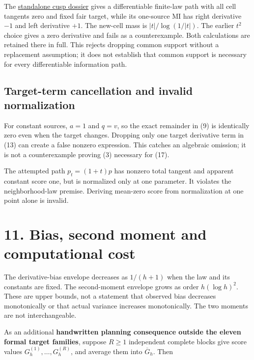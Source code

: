 \documentclass[11pt,a4paper]{article}
\begin{document}
The \href{https://github.com/sepahead/pid-rs/blob/main/audit/research/support-change-mi-cusp/EXPOSITION.md}{standalone cusp dossier} gives a differentiable finite-law path with all cell tangents zero and fixed fair target, while its one-source MI has right derivative \(-1\) and left derivative \(+1\). The new-cell mass is \(|t|/\log(1/|t|)\). The earlier \(t^2\) choice gives a zero derivative and fails as a counterexample. Both calculations are retained there in full. This rejects dropping common support without a replacement assumption; it does not establish that common support is necessary for every differentiable information path.

\subsection{Target-term cancellation and invalid normalization}\label{target-term-cancellation-and-invalid-normalization}

For constant sources, \(a=1\) and \(q=v\), so the exact remainder in (9) is identically zero even when the target changes. Dropping only one target derivative term in (13) can create a false nonzero expression. This catches an algebraic omission; it is not a counterexample proving (3) necessary for (17).

The attempted path \(p_t=(1+t)p\) has nonzero total tangent and apparent constant score one, but is normalized only at one parameter. It violates the neighborhood-law premise. Deriving mean-zero score from normalization at one point alone is invalid.

\section{11. Bias, second moment and computational cost}\label{bias-second-moment-and-computational-cost}

The derivative-bias envelope decreases as \(1/(h+1)\) when the law and its constants are fixed. The second-moment envelope grows as order \(h(\log h)^2\). These are upper bounds, not a statement that observed bias decreases monotonically or that actual variance increases monotonically. The two moments are not interchangeable.

As an additional \textbf{handwritten planning consequence outside the eleven formal target families}, suppose \(R\ge1\) independent complete blocks give score values \(G_h^{(1)},\ldots,G_h^{(R)}\), and average them into \(\overline G_h\). Then
\end{document}
